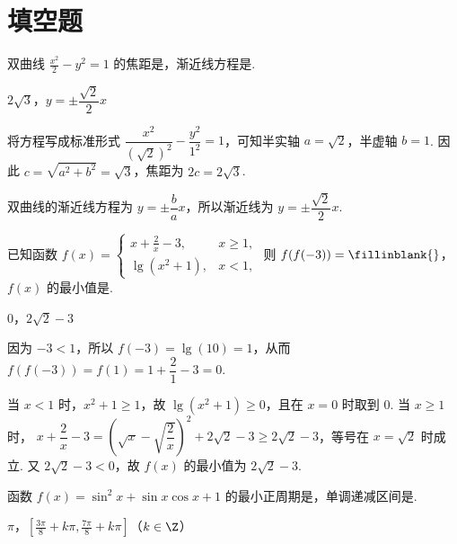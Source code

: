 \section{填空题}

\begin{problem}
双曲线 \(\frac{x^2}{2} - y^2 = 1\) 的焦距是\fillinblank{}，渐近线方程是\fillinblank{}.
\end{problem}

\begin{answer}
\(2\sqrt{3}\)，\(y=\pm\dfrac{\sqrt{2}}{2}x\)
\end{answer}

\begin{solution}
将方程写成标准形式
\(\dfrac{x^2}{(\sqrt{2})^2}-\dfrac{y^2}{1^2}=1\)，可知半实轴 \(a=\sqrt{2}\)，半虚轴 \(b=1\). 因此
\(c=\sqrt{a^2+b^2}=\sqrt{3}\)，焦距为 \(2c=2\sqrt{3}\).

双曲线的渐近线方程为 \(y=\pm\dfrac{b}{a}x\)，所以渐近线为
\(y=\pm\dfrac{\sqrt{2}}{2}x\).
\end{solution}

\begin{problem}
已知函数 \( f(x) = \begin{cases}
x + \frac{2}{x} - 3, & x \geqslant 1,\\
\lg (x^2 + 1), & x < 1,
\end{cases} \) 则 \( f(f(-3)) =\fillinblank{} \)，\( f(x) \) 的最小值是\fillinblank{}.
\end{problem}

\begin{answer}
\(0\)，\(2\sqrt{2}-3\)
\end{answer}

\begin{solution}
因为 \(-3<1\)，所以 \(f(-3)=\lg(10)=1\)，从而
\(f(f(-3))=f(1)=1+\dfrac{2}{1}-3=0\).

当 \(x<1\) 时，\(x^2+1\geqslant1\)，故 \(\lg(x^2+1)\geqslant0\)，且在 \(x=0\) 时取到 \(0\). 当 \(x\geqslant1\) 时，
\(x+\dfrac{2}{x}-3=\left(\sqrt{x}-\sqrt{\dfrac{2}{x}}\right)^2+2\sqrt{2}-3\geqslant2\sqrt{2}-3\)，等号在 \(x=\sqrt{2}\) 时成立. 又 \(2\sqrt{2}-3<0\)，故 \(f(x)\) 的最小值为 \(2\sqrt{2}-3\).
\end{solution}

\begin{problem}
函数 \( f(x) = \sin^2 x + \sin x \cos x + 1 \) 的最小正周期是\fillinblank{}，单调递减区间是\fillinblank{}.
\end{problem}

\begin{answer}
\(\pi\)，\(\left[\frac{3\pi}{8}+k\pi,\frac{7\pi}{8}+k\pi\right]\)（\(k\in\Z\)）
\end{answer}

